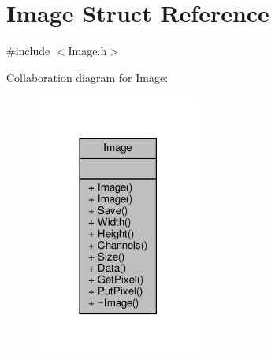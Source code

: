 \hypertarget{structImage}{}\section{Image Struct Reference}
\label{structImage}


{\ttfamily \#include $<$Image.\+h$>$}



Collaboration diagram for Image\+:
\nopagebreak
\begin{figure}[H]
\begin{center}
\leavevmode
\includegraphics[width=153pt]{structImage__coll__graph}
\end{center}
\end{figure}
